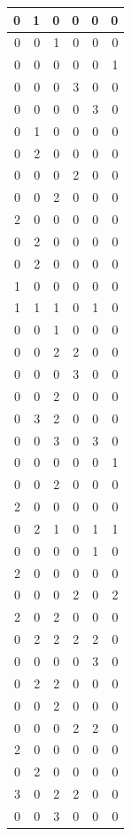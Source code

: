 \documentclass[
  12pt,
]{krantz}
\begin{document}
\begin{tabular}{r|r|r|r|r|r}
\hline
0 & 1 & 0 & 0 & 0 & 0\\
\hline
0 & 0 & 1 & 0 & 0 & 0\\
\hline
0 & 0 & 0 & 0 & 0 & 1\\
\hline
0 & 0 & 0 & 3 & 0 & 0\\
\hline
0 & 0 & 0 & 0 & 3 & 0\\
\hline
0 & 1 & 0 & 0 & 0 & 0\\
\hline
0 & 2 & 0 & 0 & 0 & 0\\
\hline
0 & 0 & 0 & 2 & 0 & 0\\
\hline
0 & 0 & 2 & 0 & 0 & 0\\
\hline
2 & 0 & 0 & 0 & 0 & 0\\
\hline
0 & 2 & 0 & 0 & 0 & 0\\
\hline
0 & 2 & 0 & 0 & 0 & 0\\
\hline
1 & 0 & 0 & 0 & 0 & 0\\
\hline
1 & 1 & 1 & 0 & 1 & 0\\
\hline
0 & 0 & 1 & 0 & 0 & 0\\
\hline
0 & 0 & 2 & 2 & 0 & 0\\
\hline
0 & 0 & 0 & 3 & 0 & 0\\
\hline
0 & 0 & 2 & 0 & 0 & 0\\
\hline
0 & 3 & 2 & 0 & 0 & 0\\
\hline
0 & 0 & 3 & 0 & 3 & 0\\
\hline
0 & 0 & 0 & 0 & 0 & 1\\
\hline
0 & 0 & 2 & 0 & 0 & 0\\
\hline
2 & 0 & 0 & 0 & 0 & 0\\
\hline
0 & 2 & 1 & 0 & 1 & 1\\
\hline
0 & 0 & 0 & 0 & 1 & 0\\
\hline
2 & 0 & 0 & 0 & 0 & 0\\
\hline
0 & 0 & 0 & 2 & 0 & 2\\
\hline
2 & 0 & 2 & 0 & 0 & 0\\
\hline
0 & 2 & 2 & 2 & 2 & 0\\
\hline
0 & 0 & 0 & 0 & 3 & 0\\
\hline
0 & 2 & 2 & 0 & 0 & 0\\
\hline
0 & 0 & 2 & 0 & 0 & 0\\
\hline
0 & 0 & 0 & 2 & 2 & 0\\
\hline
2 & 0 & 0 & 0 & 0 & 0\\
\hline
0 & 2 & 0 & 0 & 0 & 0\\
\hline
3 & 0 & 2 & 2 & 0 & 0\\
\hline
0 & 0 & 3 & 0 & 0 & 0\\

\end{tabular}
\end{document}
